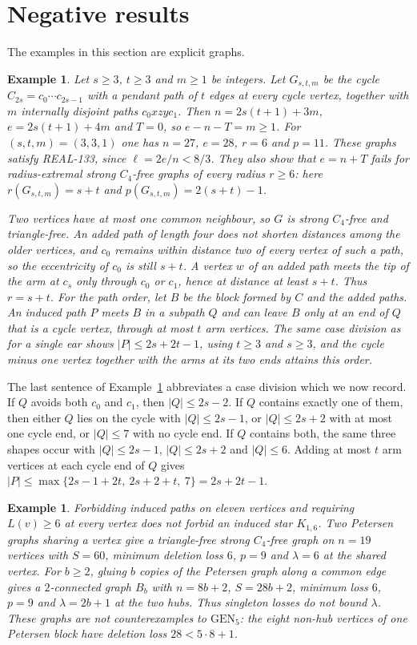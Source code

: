 \documentclass[ASNA]{USG}
\theoremstyle{WBstyletwo}
\newtheorem{example}[theorem]{Example}
\numberwithin{equation}{section}
\newcommand{\lr}{\ell}
\newcommand{\pp}{p}
\newcommand{\GEN}{\mathrm{GEN}}
\begin{document}
\section{Negative results}\label{sec:neg}

The examples in this section are explicit graphs.

\begin{example}\label{ex:radstar}
Let $s\ge 3$, $t\ge 3$ and $m\ge 1$ be integers. Let $G_{s,t,m}$ be the cycle $C_{2s}=c_0\cdots c_{2s-1}$ with a pendant path of $t$ edges at every cycle vertex, together with $m$ internally disjoint paths $c_0xzyc_1$. Then $n=2s(t+1)+3m$, $e=2s(t+1)+4m$ and $T=0$, so $e-n-T=m\ge 1$. For $(s,t,m)=(3,3,1)$ one has $n=27$, $e=28$, $r=6$ and $\pp=11$. These graphs satisfy REAL-133, since $\lr=2e/n<8/3$. They also show that $e=n+T$ fails for radius-extremal strong $C_4$-free graphs of every radius $r\ge 6$: here $r(G_{s,t,m})=s+t$ and $\pp(G_{s,t,m})=2(s+t)-1$.

Two vertices have at most one common neighbour, so $G$ is strong $C_4$-free and triangle-free. An added path of length four does not shorten distances among the older vertices, and $c_0$ remains within distance two of every vertex of such a path, so the eccentricity of $c_0$ is still $s+t$. A vertex $w$ of an added path meets the tip of the arm at $c_s$ only through $c_0$ or $c_1$, hence at distance at least $s+t$. Thus $r=s+t$. For the path order, let $B$ be the block formed by $C$ and the added paths. An induced path $P$ meets $B$ in a subpath $Q$ and can leave $B$ only at an end of $Q$ that is a cycle vertex, through at most $t$ arm vertices. The same case division as for a single ear shows $|P|\le 2s+2t-1$, using $t\ge 3$ and $s\ge 3$, and the cycle minus one vertex together with the arms at its two ends attains this order.
\end{example}

The last sentence of Example~\ref{ex:radstar} abbreviates a case division which we now record. If $Q$ avoids both $c_0$ and $c_1$, then $|Q|\le 2s-2$. If $Q$ contains exactly one of them, then either $Q$ lies on the cycle with $|Q|\le 2s-1$, or $|Q|\le 2s+2$ with at most one cycle end, or $|Q|\le 7$ with no cycle end. If $Q$ contains both, the same three shapes occur with $|Q|\le 2s-1$, $|Q|\le 2s+2$ and $|Q|\le 6$. Adding at most $t$ arm vertices at each cycle end of $Q$ gives $|P|\le\max\{2s-1+2t,\ 2s+2+t,\ 7\}=2s+2t-1$.

\begin{example}\label{ex:star5}
Forbidding induced paths on eleven vertices and requiring $L(v)\ge 6$ at every vertex does not forbid an induced star $K_{1,6}$. Two Petersen graphs sharing a vertex give a triangle-free strong $C_4$-free graph on $n=19$ vertices with $S=60$, minimum deletion loss $6$, $\pp=9$ and $\lambda=6$ at the shared vertex. For $b\ge 2$, gluing $b$ copies of the Petersen graph along a common edge gives a $2$-connected graph $B_b$ with $n=8b+2$, $S=28b+2$, minimum loss $6$, $\pp=9$ and $\lambda=2b+1$ at the two hubs. Thus singleton losses do not bound $\lambda$. These graphs are not counterexamples to $\GEN_5$: the eight non-hub vertices of one Petersen block have deletion loss $28<5\cdot 8+1$.
\end{example}
\end{document}
